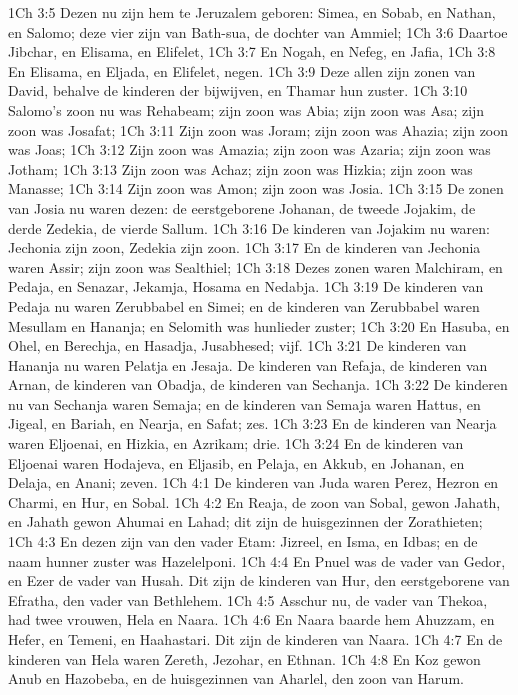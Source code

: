 1Ch 3:5  Dezen nu zijn hem te Jeruzalem geboren: Simea, en Sobab, en Nathan, en Salomo; deze vier zijn van Bath-sua, de dochter van Ammiel;
1Ch 3:6  Daartoe Jibchar, en Elisama, en Elifelet,
1Ch 3:7  En Nogah, en Nefeg, en Jafia,
1Ch 3:8  En Elisama, en Eljada, en Elifelet, negen.
1Ch 3:9  Deze allen zijn zonen van David, behalve de kinderen der bijwijven, en Thamar hun zuster.
1Ch 3:10  Salomo's zoon nu was Rehabeam; zijn zoon was Abia; zijn zoon was Asa; zijn zoon was Josafat;
1Ch 3:11  Zijn zoon was Joram; zijn zoon was Ahazia; zijn zoon was Joas;
1Ch 3:12  Zijn zoon was Amazia; zijn zoon was Azaria; zijn zoon was Jotham;
1Ch 3:13  Zijn zoon was Achaz; zijn zoon was Hizkia; zijn zoon was Manasse;
1Ch 3:14  Zijn zoon was Amon; zijn zoon was Josia.
1Ch 3:15  De zonen van Josia nu waren dezen: de eerstgeborene Johanan, de tweede Jojakim, de derde Zedekia, de vierde Sallum.
1Ch 3:16  De kinderen van Jojakim nu waren: Jechonia zijn zoon, Zedekia zijn zoon.
1Ch 3:17  En de kinderen van Jechonia waren Assir; zijn zoon was Sealthiel;
1Ch 3:18  Dezes zonen waren Malchiram, en Pedaja, en Senazar, Jekamja, Hosama en Nedabja.
1Ch 3:19  De kinderen van Pedaja nu waren Zerubbabel en Simei; en de kinderen van Zerubbabel waren Mesullam en Hananja; en Selomith was hunlieder zuster;
1Ch 3:20  En Hasuba, en Ohel, en Berechja, en Hasadja, Jusabhesed; vijf.
1Ch 3:21  De kinderen van Hananja nu waren Pelatja en Jesaja. De kinderen van Refaja, de kinderen van Arnan, de kinderen van Obadja, de kinderen van Sechanja.
1Ch 3:22  De kinderen nu van Sechanja waren Semaja; en de kinderen van Semaja waren Hattus, en Jigeal, en Bariah, en Nearja, en Safat; zes.
1Ch 3:23  En de kinderen van Nearja waren Eljoenai, en Hizkia, en Azrikam; drie.
1Ch 3:24  En de kinderen van Eljoenai waren Hodajeva, en Eljasib, en Pelaja, en Akkub, en Johanan, en Delaja, en Anani; zeven.
1Ch 4:1  De kinderen van Juda waren Perez, Hezron en Charmi, en Hur, en Sobal.
1Ch 4:2  En Reaja, de zoon van Sobal, gewon Jahath, en Jahath gewon Ahumai en Lahad; dit zijn de huisgezinnen der Zorathieten;
1Ch 4:3  En dezen zijn van den vader Etam: Jizreel, en Isma, en Idbas; en de naam hunner zuster was Hazelelponi.
1Ch 4:4  En Pnuel was de vader van Gedor, en Ezer de vader van Husah. Dit zijn de kinderen van Hur, den eerstgeborene van Efratha, den vader van Bethlehem.
1Ch 4:5  Asschur nu, de vader van Thekoa, had twee vrouwen, Hela en Naara.
1Ch 4:6  En Naara baarde hem Ahuzzam, en Hefer, en Temeni, en Haahastari. Dit zijn de kinderen van Naara.
1Ch 4:7  En de kinderen van Hela waren Zereth, Jezohar, en Ethnan.
1Ch 4:8  En Koz gewon Anub en Hazobeba, en de huisgezinnen van Aharlel, den zoon van Harum.
